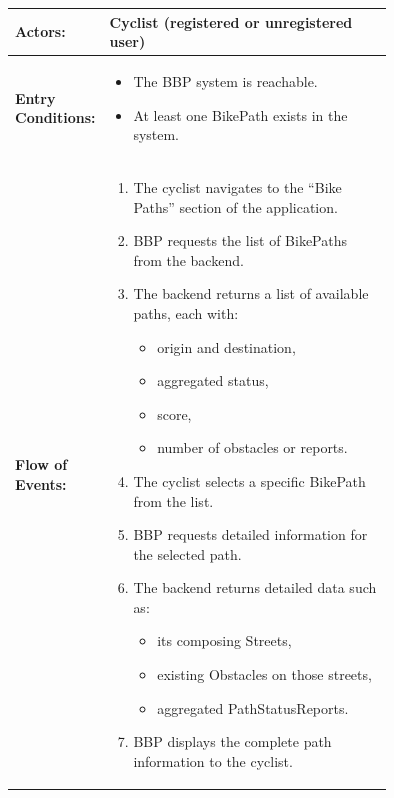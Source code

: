\begin{center}
\begin{longtable}{|l|p{0.75\linewidth}|}
    \hline
    \textbf{Actors:}           
    & Cyclist (registered or unregistered user)                                               \\
    \hline

    \textbf{Entry Conditions:} 
    & \begin{itemize}
          \item The BBP system is reachable.
          \item At least one BikePath exists in the system.
       \end{itemize}                                                                          \\
    \hline

    \textbf{Flow of Events:}   
    & \begin{enumerate}
          \item The cyclist navigates to the “Bike Paths” section of the application.
          \item BBP requests the list of BikePaths from the backend.
          \item The backend returns a list of available paths, each with:
                \begin{itemize}
                    \item origin and destination,
                    \item aggregated status,
                    \item score,
                    \item number of obstacles or reports.
                \end{itemize}
          \item The cyclist selects a specific BikePath from the list.
          \item BBP requests detailed information for the selected path.
          \item The backend returns detailed data such as:
                \begin{itemize}
                    \item its composing Streets,
                    \item existing Obstacles on those streets,
                    \item aggregated PathStatusReports.
                \end{itemize}
          \item BBP displays the complete path information to the cyclist.
       \end{enumerate}                                                                         \\
    \hline


\end{longtable}
\end{center}

